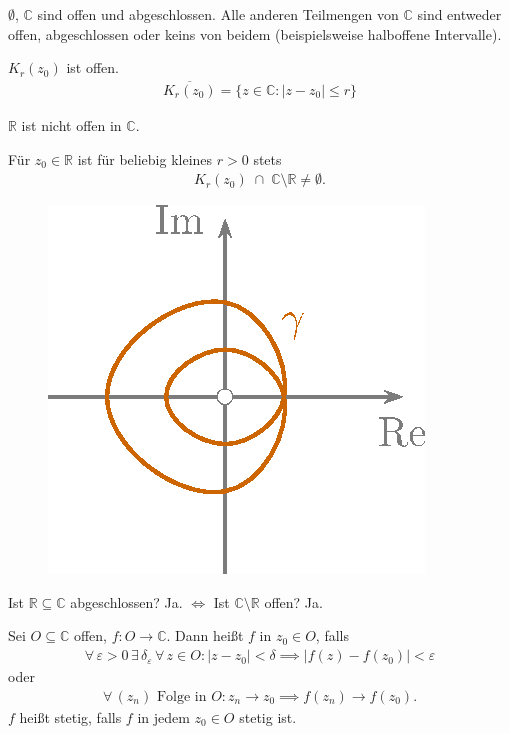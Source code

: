 \documentclass[a4paper,10pt]{scrbook}
\begin{document}
\begin{example}
  \begin{enum-arab}
    \item $\emptyset$, $\mathbb{C}$ sind offen und abgeschlossen. Alle anderen Teilmengen von $\mathbb{C}$ sind entweder offen, abgeschlossen oder keins von beidem (beispielsweise halboffene Intervalle).

    \item $K_r(z_0)$ ist offen.
    \begin{align*}
      \overline{K_r(z_0)} = \{ z \in \mathbb{C} : |z-z_0| \leq r \}
    \end{align*}

    \item $\mathbb{R}$ ist nicht offen in $\mathbb{C}$.

	Für $z_0\in \mathbb{R}$ ist für beliebig kleines $r>0$ stets
    \begin{align*}
      K_r(z_0) \;\cap\; \mathbb{C} \setminus \mathbb{R} \neq \emptyset.
    \end{align*}

    \begin{figure}[H]
      \centering
      \includegraphics[scale=0.2]{images/ana3-tmp-3}
    \end{figure}

    Ist $\mathbb{R} \subseteq \mathbb{C}$ abgeschlossen? Ja. $\iff$ Ist $\mathbb{C} \setminus \mathbb{R}$ offen? Ja.
  \end{enum-arab}
\end{example}

\begin{theorem}[Definition]
  Sei $O \subseteq \mathbb{C}$ offen, $f : O \to \mathbb{C}$. Dann heißt $f$  in $z_0 \in O$, falls
  \begin{align*}
    \forall \, \varepsilon > 0 \, \exists \, \delta_\varepsilon \, \forall \, z \in O : |z - z_0| < \delta \implies |f(z) - f(z_0)| < \varepsilon
  \end{align*}
  oder
  \begin{align*}
    \forall \, (z_n) \text{ Folge in $O$} : z_n \to z_0 \implies f(z_n) \to f(z_0).
  \end{align*}
  $f$ heißt stetig, falls $f$ in jedem $z_0 \in O$ stetig ist.
\end{theorem}
\end{document}
